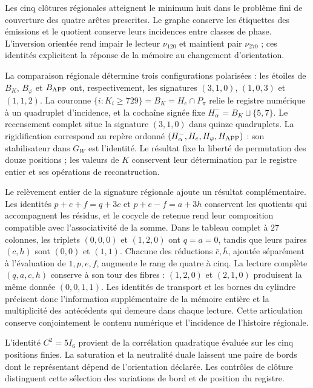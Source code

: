 Les cinq clôtures régionales atteignent le minimum huit dans le problème fini de couverture des quatre arêtes prescrites. Le graphe conserve les étiquettes des émissions et le quotient conserve leurs incidences entre classes de phase. L'inversion orientée rend impair le lecteur \(\nu_{120}\) et maintient pair \(\nu_{270}\) ; ces identités explicitent la réponse de la mémoire au changement d'orientation.

La comparaison régionale détermine trois configurations polarisées :
les étoiles de \(B_K\), \(B_\varphi\) et \(B_{\rm APP}\) ont,
respectivement, les signatures \((3,1,0)\), \((1,0,3)\) et \((1,1,2)\).
La couronne \(\{i:K_i\geq729\}=B_K=H_e\cap P_\pi\) relie
le registre numérique à un quadruplet d’incidence, et la cochaîne
signée fixe \(H^-_\alpha=B_K\sqcup\{5,7\}\).
Le recensement complet situe la signature \((3,1,0)\) dans quinze quadruplets.
La rigidification correspond au repère ordonné
\((H^-_\alpha,H_e,H_\varphi,H_{\rm APP})\) : son stabilisateur
dans \(G_W\) est l’identité. Le résultat fixe la liberté de
permutation des douze positions ; les valeurs de \(K\) conservent
leur détermination par le registre entier et ses opérations de
reconstruction.

Le relèvement entier de la signature régionale ajoute un résultat
complémentaire. Les identités \(p+e+f=q+3c\) et
\(p+e-f=a+3h\) conservent les quotients qui accompagnent les résidus,
et le cocycle de retenue rend leur composition compatible avec
l’associativité de la somme. Dans le tableau complet à \(27\) colonnes,
les triplets \((0,0,0)\) et \((1,2,0)\) ont \(q=a=0\), tandis que
leurs paires \((c,h)\) sont \((0,0)\) et \((1,1)\).
Chacune des réductions \(\bar c,\bar h\), ajoutée séparément
à l’évaluation de \(1,p,e,f\), augmente le rang de quatre à cinq.
La lecture complète \((q,a,c,h)\) conserve à son tour des fibres :
\((1,2,0)\) et \((2,1,0)\) produisent la même donnée
\((0,0,1,1)\). Les identités de transport et les bornes du cylindre
précisent donc l’information supplémentaire de la mémoire entière
et la multiplicité des antécédents qui demeure dans chaque lecture.
Cette articulation conserve conjointement le contenu numérique et
l’incidence de l’histoire régionale.



L’identité \(C^2=5I_6\) provient de la corrélation quadratique évaluée
sur les cinq positions finies. La saturation et la neutralité duale laissent
une paire de bords dont le représentant dépend de l’orientation
déclarée. Les contrôles de clôture distinguent cette sélection des
variations de bord et de position du registre. 

